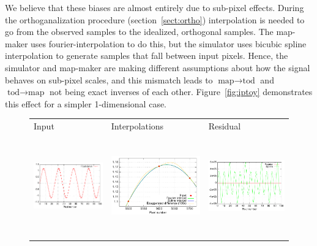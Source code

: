 \documentclass{article}
\begin{document}
We believe that these biases are almost entirely due to sub-pixel effects.
During the orthoganalization procedure (section~\ref{sect:ortho})
interpolation is needed to go from the observed samples to the
idealized, orthogonal samples. The map-maker uses fourier-interpolation
to do this, but the simulator uses bicubic spline interpolation to
generate samples that fall between input pixels. Hence, the
simulator and map-maker are making different assumptions about how
the signal behaves on sub-pixel scales, and this mismatch leads
to $\textrm{map}\rightarrow\textrm{tod}$ and $\textrm{tod}\rightarrow
\textrm{map}$ not being exact inverses of each other. Figure~\ref{fig:iptoy}
demonstrates this effect for a simpler 1-dimensional case.
\begin{figure}[h!]
	\centering
	\hspace*{-13mm}\begin{tabular}{m{59mm}m{59mm}m{59mm}}
		\hspace{30mm}Input & \hspace{20mm}Interpolations & \hspace{30mm}Residual \\
		\includegraphics[height=43mm,clip,trim=0 0 0 0]{plots/subpixel_model_input.pdf} &
		\includegraphics[height=43mm,clip,trim=0 0 0 0]{plots/subpixel_model_interpol.pdf} &
		\includegraphics[height=43mm,clip,trim=0 0 0 0]{plots/subpixel_model_residual.pdf}

\end{tabular}
\end{figure}
\end{document}
